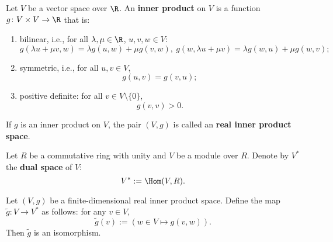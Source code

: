 \begin{definition}
  Let $V$ be a vector space over $\R$.
  An \textbf{inner product} on $V$ is a function
  $g \colon V \times V \to \R$ that is:
  \begin{enumerate}
    \item
      bilinear, i.e., for all $\lambda, \mu \in \R$, $u, v, w \in V$:
      \begin{equation}
        g(\lambda u + \mu v, w) = \lambda g(u, w) + \mu g(v, w),\
        g(w, \lambda u + \mu v) = \lambda g(w, u) + \mu g(w, v);
      \end{equation}
    \item
      symmetric, i.e., for all $u, v \in V$,
      \begin{equation}
        g(u, v) = g(v, u);
      \end{equation}
    \item
      positive definite: for all $v \in V \setminus \{0\}$,
      \begin{equation}
        g(v, v) > 0.
      \end{equation}
  \end{enumerate}
  If $g$ is an inner product on $V$, the pair $(V, g)$ is called an
  \textbf{real inner product space}.
\end{definition}
\begin{notation}
  Let $R$ be a commutative ring with unity and $V$ be a module over $R$.
  Denote by $V^*$ the \textbf{dual space} of $V$:
  \begin{equation}
    V^* := \Hom(V, R).
  \end{equation}
\end{notation}
\begin{proposition}
  Let $(V, g)$ be a finite-dimensional real inner product space.
  Define the map $\tilde{g} \colon V \to V^*$ as follows: for any $v \in V$,
  \begin{equation}
    \tilde{g}(v) := (w \in V \mapsto g(v, w)).
  \end{equation}
  Then $\tilde{g}$ is an isomorphism.
\end{proposition}
